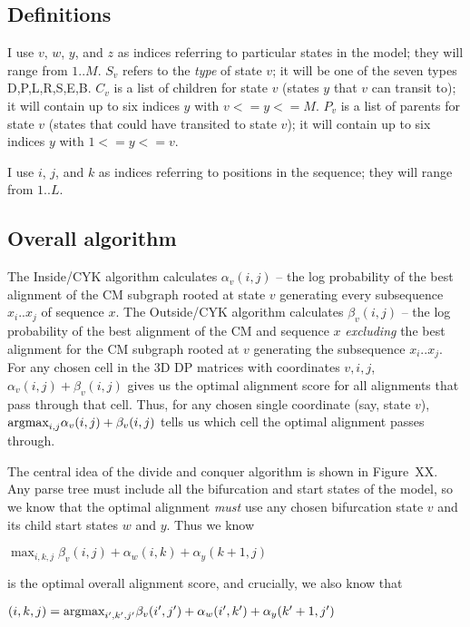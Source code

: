 \documentclass[11pt]{article}
\def\argmax{\mbox{\rm{argmax}}}      %
\begin{document}
\subsection{Definitions}

I use $v$, $w$, $y$, and $z$ as indices referring to particular states
in the model; they will range from $1..M$. $S_v$ refers to the
\emph{type} of state $v$; it will be one of the seven types
{D,P,L,R,S,E,B}. $C_v$ is a list of children for state $v$ (states $y$
that $v$ can transit to); it will contain up to six indices $y$ with
$v <= y <= M$. $P_v$ is a list of parents for state $v$ (states that
could have transited to state $v$); it will contain up to six indices
$y$ with $1 <= y <= v$.

I use $i$, $j$, and $k$ as indices referring to positions in the
sequence; they will range from $1..L$.

\subsection{Overall algorithm}

The Inside/CYK algorithm calculates $\alpha_v(i,j)$ -- the log
probability of the best alignment of the CM subgraph rooted at state
$v$ generating every subsequence $x_i..x_j$ of sequence $x$.  The
Outside/CYK algorithm calculates $\beta_v(i,j)$ -- the log probability
of the best alignment of the CM and sequence $x$
\emph{excluding} the best alignment for the CM subgraph rooted at
$v$ generating the subsequence $x_i..x_j$.  For any chosen cell in the
3D DP matrices with coordinates $v,i,j$, $\alpha_v(i,j) +
\beta_v(i,j)$ gives us the optimal alignment score for all alignments
that pass through that cell. Thus, for any chosen single coordinate
(say, state $v$), $\argmax_{i,j} \alpha_{v}(i,j) +
\beta_{v}(i,j)$ tells us which cell the optimal alignment
passes through.

The central idea of the divide and conquer algorithm is shown in
Figure~XX. Any parse tree must include all the bifurcation and start
states of the model, so we know that the optimal alignment \emph{must}
use any chosen bifurcation state $v$ and its child start states $w$
and $y$. Thus we know

      $\max_{i,k,j} \beta_{v}(i,j) + \alpha_{w}(i,k) + \alpha_{y}(k+1,j)$

is the optimal overall alignment score, and crucially, we also know
that

      $(i,k,j) = \argmax_{i',k',j'}  \beta_{v}(i',j') +  \alpha_{w}(i',k') + \alpha_{y}(k'+1,j') $
\end{document}
